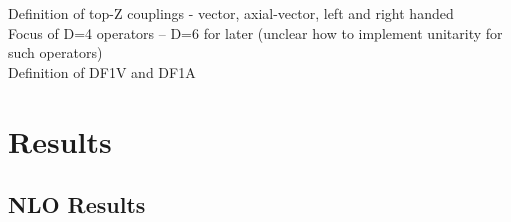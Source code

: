\documentclass[preprint]{JHEP3} %
\def\DelFA{\Delta F_{1,A}}
\def\DelFV{\Delta F_{1,V}}
\def\ttbZ{t\bar{t}Z}
\begin{document}
%
Definition of top-Z couplings - vector, axial-vector, left and right handed \\
Focus of D=4 operators -- D=6 for later (unclear how to implement unitarity for such operators) \\
Definition of DF1V and DF1A

\section{Results}
\subsection{NLO Results}
\end{document}

